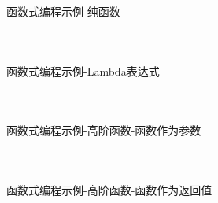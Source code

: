 \documentclass[UTF8,aspectratio=169]{beamer}
\begin{document}
\begin{frame}[fragile]{函数式编程示例-纯函数}
    \begin{columns}
        \begin{column}{0.48\textwidth}
            \inputminted[firstline=1,lastline=11]{cpp}{code/functional_programming_0.cpp}
        \end{column}
        \begin{column}{0.48\textwidth}
            \inputminted[firstline=13,lastline=25]{cpp}{code/functional_programming_0.cpp}
        \end{column}
    \end{columns}
\end{frame}

\begin{frame}[fragile]{函数式编程示例-Lambda表达式}
    \begin{columns}
        \begin{column}{0.48\textwidth}
            \inputminted[firstline=1,lastline=19]{cpp}{code/functional_programming_1.cpp}
        \end{column}
        \begin{column}{0.48\textwidth}
            \inputminted[firstline=20,lastline=37]{cpp}{code/functional_programming_1.cpp}
        \end{column}
    \end{columns}
\end{frame}

\begin{frame}[fragile]{函数式编程示例-高阶函数-函数作为参数}
    \begin{columns}
        \begin{column}{0.48\textwidth}
            \inputminted[firstline=1,lastline=17]{cpp}{code/functional_programming_2.cpp}
        \end{column}
        \begin{column}{0.48\textwidth}
            \inputminted[firstline=19,lastline=39]{cpp}{code/functional_programming_2.cpp}
        \end{column}
    \end{columns}
\end{frame}

\begin{frame}[fragile]{函数式编程示例-高阶函数-函数作为返回值}
    \begin{columns}
        \begin{column}{0.48\textwidth}
            \inputminted[firstline=1,lastline=17]{cpp}{code/functional_programming_3.cpp}
        \end{column}
        \begin{column}{0.48\textwidth}
            \inputminted[firstline=19,lastline=35]{cpp}{code/functional_programming_3.cpp}
        \end{column}
    \end{columns}
\end{frame}
\end{document}
